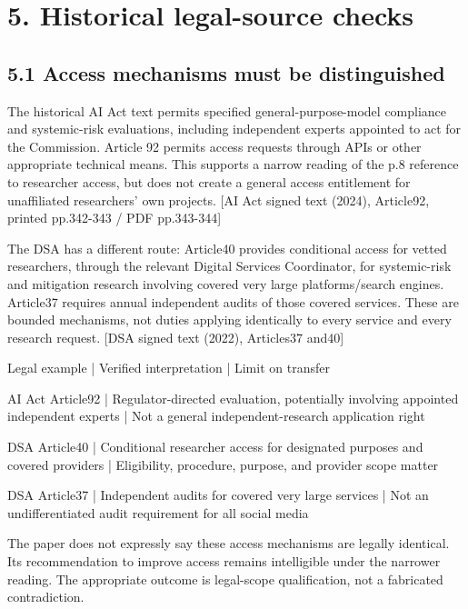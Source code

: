 \documentclass[10pt]{article}
\begin{document}
\section*{5. Historical legal-source checks}
\subsection*{5.1 Access mechanisms must be distinguished}
The historical AI Act text permits specified general-purpose-model compliance and systemic-risk evaluations, including independent experts appointed to act for the Commission. Article 92 permits access requests through APIs or other appropriate technical means. This supports a narrow reading of the p.8 reference to researcher access, but does not create a general access entitlement for unaffiliated researchers’ own projects. [AI Act signed text (2024), Article92, printed pp.342-343 / PDF pp.343-344]\par
The DSA has a different route: Article40 provides conditional access for vetted researchers, through the relevant Digital Services Coordinator, for systemic-risk and mitigation research involving covered very large platforms/search engines. Article37 requires annual independent audits of those covered services. These are bounded mechanisms, not duties applying identically to every service and every research request. [DSA signed text (2022), Articles37 and40]\par
Legal example | Verified interpretation | Limit on transfer\par
AI Act Article92 | Regulator-directed evaluation, potentially involving appointed independent experts | Not a general independent-research application right\par
DSA Article40 | Conditional researcher access for designated purposes and covered providers | Eligibility, procedure, purpose, and provider scope matter\par
DSA Article37 | Independent audits for covered very large services | Not an undifferentiated audit requirement for all social media\par
The paper does not expressly say these access mechanisms are legally identical. Its recommendation to improve access remains intelligible under the narrower reading. The appropriate outcome is legal-scope qualification, not a fabricated contradiction.\par
\end{document}
